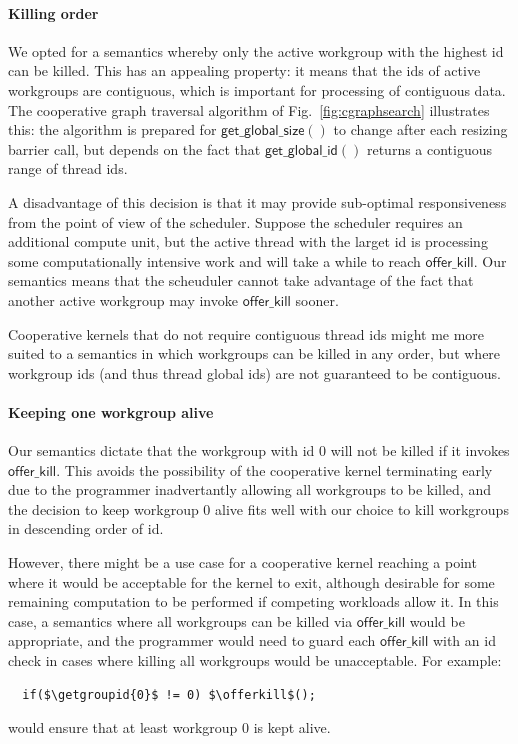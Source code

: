 \documentclass[numbers,nocopyrightspace,10pt]{sigplanconf}
\newcommand{\myfig}{Fig.~}
\newcommand{\offerkill}{\mathsf{offer\_kill}}
\newcommand{\getgroupid}{\mathsf{get\_group\_id}}
\newcommand{\getglobalid}{\mathsf{get\_global\_id}}
\newcommand{\getglobalsize}{\mathsf{get\_global\_size}}
\begin{document}
\paragraph{Killing order}

We opted for a semantics whereby only the active workgroup with the
highest id can be killed.  This has an appealing property: it means
that the ids of active workgroups are contiguous, which is important
for processing of contiguous data.  The cooperative graph traversal
algorithm of \myfig\ref{fig:cgraphsearch} illustrates this: the algorithm is prepared
for $\getglobalsize()$ to change after each resizing barrier call, but
depends on the fact that $\getglobalid()$ returns a contiguous range
of thread ids.

A disadvantage of this decision is that it may provide sub-optimal
responsiveness from the point of view of the scheduler.  Suppose the
scheduler requires an additional compute unit, but the active thread
with the larget id is processing some computationally intensive work
and will take a while to reach $\offerkill$.  Our semantics means that
the scheuduler cannot take advantage of the fact that another active
workgroup may invoke $\offerkill$ sooner.

Cooperative kernels that do not require contiguous thread ids might me
more suited to a semantics in which workgroups can be killed in any
order, but where workgroup ids (and thus thread global ids) are not
guaranteed to be contiguous.

\paragraph{Keeping one workgroup alive}

Our semantics dictate that the workgroup with id 0 will not be killed
if it invokes $\offerkill$.  This avoids the possibility of the
cooperative kernel terminating early due to the programmer
inadvertantly allowing all workgroups to be killed, and the decision
to keep workgroup 0 alive fits well with our choice to kill workgroups
in descending order of id.

However, there might be a use case for a cooperative kernel reaching a
point where it would be acceptable for the kernel to exit, although
desirable for some remaining computation to be performed if competing
workloads allow it.  In this case, a semantics where all workgroups can be killed via $\offerkill$ would be appropriate, and the programmer would need to guard each $\offerkill$ with an id check in cases where killing all workgroups would be unacceptable.  For example:
%
\lstset{basicstyle=\tt,numbers=none}
\begin{lstlisting}
  if($\getgroupid{0}$ != 0) $\offerkill$();
\end{lstlisting}
\lstset{basicstyle=\scriptsize\tt,numbers=left}
%
would ensure that at least workgroup 0 is kept alive.
\end{document}
